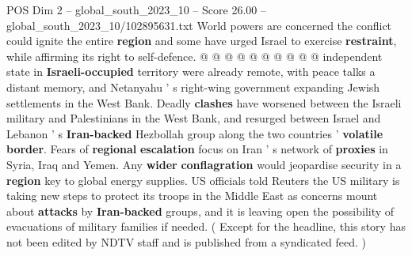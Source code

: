 \begin{textsample}{POS Dim 2 – global\_south\_2023\_10 – Score 26.00 – global\_south\_2023\_10/102895631.txt}
World powers are concerned the conflict could ignite the entire \textbf{region} and some have urged Israel to exercise \textbf{restraint}, while affirming its right to self-defence. @ @ @ @ @ @ @ @ @ @ independent state in \textbf{Israeli-occupied} territory were already remote, with peace talks a distant memory, and Netanyahu ' s right-wing government expanding Jewish settlements in the West Bank.
Deadly \textbf{clashes} have worsened between the Israeli military and Palestinians in the West Bank, and resurged between Israel and Lebanon ' s \textbf{Iran-backed} Hezbollah group along the two countries ' \textbf{volatile} \textbf{border}.
Fears of \textbf{regional} \textbf{escalation} focus on Iran ' s network of \textbf{proxies} in Syria, Iraq and Yemen.
Any \textbf{wider} \textbf{conflagration} would jeopardise security in a \textbf{region} key to global energy supplies.
US officials told Reuters the US military is taking new steps to protect its troops in the Middle East as concerns mount about \textbf{attacks} by \textbf{Iran-backed} groups, and it is leaving open the possibility of evacuations of military families if needed. ( Except for the headline, this story has not been edited by NDTV staff and is published from a syndicated feed. )

\end{textsample}
